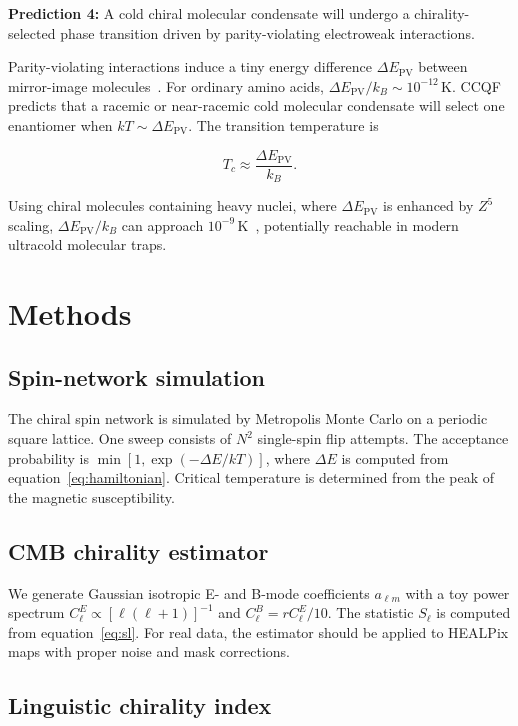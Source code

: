 \documentclass[twocolumn,11pt,a4paper]{article}
\begin{document}
\textbf{Prediction 4:} A cold chiral molecular condensate will undergo a chirality-selected phase transition driven by parity-violating electroweak interactions.

Parity-violating interactions induce a tiny energy difference $\Delta E_\mathrm{PV}$ between mirror-image molecules~\cite{hegstrom1980}. For ordinary amino acids, $\Delta E_\mathrm{PV}/k_B \sim 10^{-12}$\,K. CCQF predicts that a racemic or near-racemic cold molecular condensate will select one enantiomer when $kT \sim \Delta E_\mathrm{PV}$. The transition temperature is

\begin{equation}
T_c \approx \frac{\Delta E_\mathrm{PV}}{k_B}.
\label{eq:tc}
\end{equation}

Using chiral molecules containing heavy nuclei, where $\Delta E_\mathrm{PV}$ is enhanced by $Z^5$ scaling, $\Delta E_\mathrm{PV}/k_B$ can approach $10^{-9}$\,K~\cite{hegstrom1980}, potentially reachable in modern ultracold molecular traps.

\section{Methods}

\subsection{Spin-network simulation}

The chiral spin network is simulated by Metropolis Monte Carlo on a periodic square lattice. One sweep consists of $N^2$ single-spin flip attempts. The acceptance probability is $\min[1, \exp(-\Delta E/kT)]$, where $\Delta E$ is computed from equation~\eqref{eq:hamiltonian}. Critical temperature is determined from the peak of the magnetic susceptibility.

\subsection{CMB chirality estimator}

We generate Gaussian isotropic E- and B-mode coefficients $a_{\ell m}$ with a toy power spectrum $C_\ell^E \propto [\ell(\ell+1)]^{-1}$ and $C_\ell^B = r C_\ell^E/10$. The statistic $S_\ell$ is computed from equation~\eqref{eq:sl}. For real data, the estimator should be applied to HEALPix maps with proper noise and mask corrections.

\subsection{Linguistic chirality index}
\end{document}
